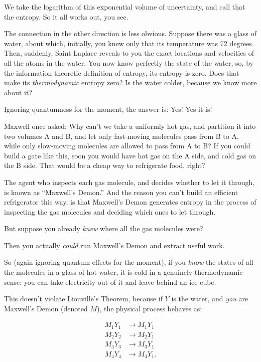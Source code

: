 {
 We take the logarithm of this exponential volume of uncertainty,
and call that the entropy. So it all works out, you see.}

{
 The connection in the other direction is less obvious. Suppose
there was a glass of water, about which, initially, you knew only that
its temperature was 72 degrees. Then, suddenly, Saint Laplace reveals
to you the exact locations and velocities of all the atoms in the
water. You now know perfectly the state of the water, so, by the
information-theoretic definition of entropy, its entropy is zero. Does
that make its \textit{thermodynamic} entropy zero? Is the water colder,
because we know more about it?}

{
 Ignoring quantumness for the moment, the answer is: Yes! Yes it
is!}

{
 Maxwell once asked: Why can't we take a uniformly
hot gas, and partition it into two volumes A and B, and let only
fast-moving molecules pass from B to A, while only slow-moving
molecules are allowed to pass from A to B? If you could build a gate
like this, soon you would have hot gas on the A side, and cold gas on
the B side. That would be a cheap way to refrigerate food, right?}

{
 The agent who inspects each gas molecule, and decides whether to
let it through, is known as
``Maxwell's Demon.''
And the reason you can't build an efficient
refrigerator this way, is that Maxwell's Demon
generates entropy in the process of inspecting the gas molecules and
deciding which ones to let through.}

{
 But suppose you already \textit{knew} where all the gas molecules
were?}

{
 Then you actually \textit{could} run Maxwell's
Demon and extract useful work.}

{
 So (again ignoring quantum effects for the moment), if you
\textit{know} the states of all the molecules in a glass of hot water,
it is cold in a genuinely thermodynamic sense: you can take electricity
out of it and leave behind an ice cube.}

{
 This doesn't violate Liouville's
Theorem, because if $Y$ is the water, and \textit{you} are
Maxwell's Demon (denoted $M$), the physical process
behaves as:}

\begin{align*}
 M_{1}Y_{1} &\rightarrow M_{1}Y_{1}  \\
 M_{2}Y_{2} &\rightarrow M_{2}Y_{1} \\
 M_{3}Y_{3} &\rightarrow M_{3}Y_{1} \\
 M_{4}Y_{4} &\rightarrow M_{4}Y_{1}.
\end{align*}

